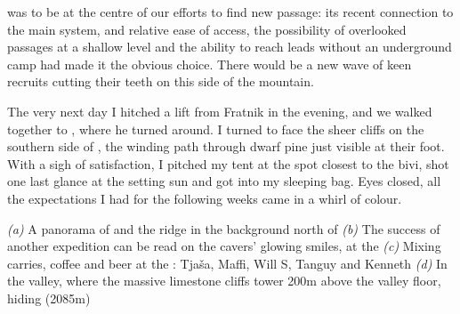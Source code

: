  was to be at the centre of our efforts to find new passage: its recent connection to the main system, and relative ease of access, the possibility of overlooked passages at a shallow level and the ability to reach leads without an underground camp had made it the obvious choice. There would be a new wave of keen recruits cutting their teeth on this side of the mountain. 

The very next day I hitched a lift from Fratnik in the evening, and we walked together to , where he turned around. I turned to face the sheer cliffs on the southern side of , the winding path through dwarf pine just visible at their foot. With a sigh of satisfaction, I pitched my tent at the spot closest to the bivi, shot one last glance at the setting sun and got into my sleeping bag. Eyes closed, all the expectations I had for the following weeks came in a whirl of colour.


\begin{pagefigure}
\checkoddpage \ifoddpage \forcerectofloat \else \forceversofloat \fi
   \centering
    \begin{subfigure}[t]{\textwidth}
    \centering
        \caption{} \label{Panoramafrom tolmin}
    \end{subfigure}
    \begin{subfigure}[t]{0.45\textwidth}
        \centering
        \caption{} \label{selfie}
    \end{subfigure}
    \begin{subfigure}[t]{0.53\textwidth}
        \centering
        \caption{} \label{Kal}
    \end{subfigure}
  \hfill
    \centering
    \begin{subfigure}[t]{\textwidth}
        \centering
        \caption{} \label{limestone cliffs}
    \end{subfigure}
  

    \caption{
    \emph{(a)} A panorama of \protect{} and the \protect{} ridge in the background
north of \protect{} 
\emph{(b)} The success of another expedition can be read on the cavers' glowing smiles, at the \protect{} 
    \emph{(c)} Mixing carries, coffee and beer at the \protect{}: Tja\v{s}a, Maffi, Will S, Tanguy and Kenneth 
    \emph{(d)} In the \protect{} valley, where the massive limestone cliffs tower 200m above the valley floor, hiding \protect{} (2085m) 
    }
\end{pagefigure}